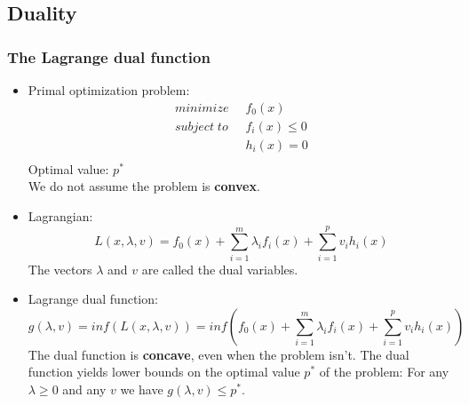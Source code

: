 \subsection*{Duality}
\subsubsection*{The Lagrange dual function}
\begin{itemize}
    \item
        Primal optimization problem:
        \begin{align*}
            minimize \; \; & f_0(x)\\
            subject \; to \; \; & f_i(x) \leq 0 \\ %
            & h_i(x) = 0 \\
        \end{align*}
        Optimal value: $p^*$\\
        We do not assume the problem is \textbf{convex}.
    \item
        Lagrangian:
        $$ L(x, \lambda, v) = f_0(x) + \sum_{i=1}^{m} \lambda_i f_i(x) + \sum_{i=1}^{p} v_i h_i(x)$$
        The vectors $\lambda$ and $v$ are called the dual variables.
    \item
        Lagrange dual function:
        $$ g(\lambda, v) = inf(L(x, \lambda, v)) = inf(f_0(x) + \sum_{i=1}^{m} \lambda_i f_i(x) + \sum_{i=1}^{p} v_i h_i(x))$$
        The dual function is \textbf{concave}, even when the problem isn't.
        The dual function yields lower bounds on the optimal value $p^*$ of the problem: For any $\lambda \geq 0$ and any $v$ we have $g(\lambda, v) \leq p^*$.
\end{itemize}
